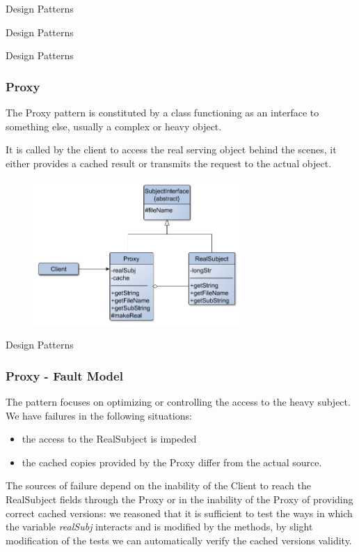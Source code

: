 \documentclass{beamer}
\begin{document}
\begin{section}{Design Patterns}
\begin{subsection}{Design Patterns}
\begin{frame}
		\end{frame}
	\end{subsection}



	\begin{subsection}{Design Patterns}
		\begin{frame}
			\frametitle{Proxy}
The Proxy pattern is constituted by a class  functioning as an interface to something else, usually a complex or heavy object.

{\small It is called by the client to access the real serving object behind the scenes, it either provides a cached result or transmits the request to the actual object.
}			
			
\begin{figure}[!h]
	\centering
	\includegraphics[width=0.7\textwidth]{./Proxy/ClassDiagram.png}
	\label{ProclassDiag}
\end{figure} 
			
		\end{frame}
	\end{subsection}


\begin{subsection}{Design Patterns}
	\begin{frame}
		\frametitle{Proxy - Fault Model}
		
		The pattern focuses on optimizing or controlling the access to the heavy subject. We have failures in the following situations:  
		\begin{itemize}
			\item the access to the RealSubject is impeded
			\item the cached copies provided by the Proxy differ from the actual source.
		\end{itemize}
		\vspace{5mm}
	The sources of failure depend on the inability of the Client to reach the RealSubject fields through the Proxy or in the inability of the Proxy of providing correct cached versions:  we reasoned that it is sufficient to test the ways in which the variable \textit{realSubj} interacts and is modified by the methods, by slight modification of the tests we can automatically verify the cached versions validity. 
		

\end{frame}
\end{subsection}
\end{section}
\end{document}
